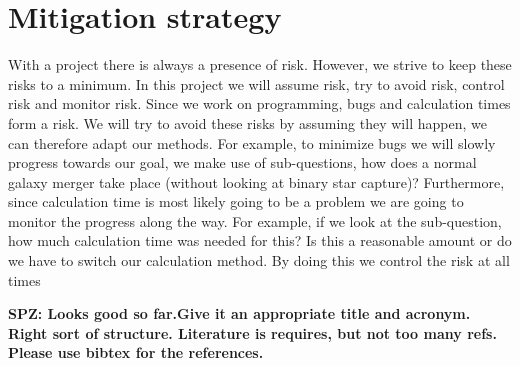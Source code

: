 \documentclass{article}
\begin{document}
\section{Mitigation strategy}%
With a project there is always a presence of risk. However, we strive to keep these risks to a minimum. In this project we will assume risk, try to avoid risk, control risk and monitor risk. Since we work on programming, bugs and calculation times form a risk. We will try to avoid these risks by assuming they will happen, we can therefore adapt our methods. For example, to minimize bugs we will slowly progress towards our goal, we make use of sub-questions, how does a normal galaxy merger take place (without looking at binary star capture)? Furthermore, since calculation time is most likely going to be a problem we are going to monitor the progress along the way. For example, if we look at the sub-question, how much calculation time was needed for this? Is this a reasonable amount or do we have to switch our calculation method. By doing this we control the risk at all times


{\bf SPZ: Looks good so far.Give it an appropriate title and acronym. Right sort of structure. Literature is requires, but not too many refs. Please use bibtex for the references.}
\end{document}
